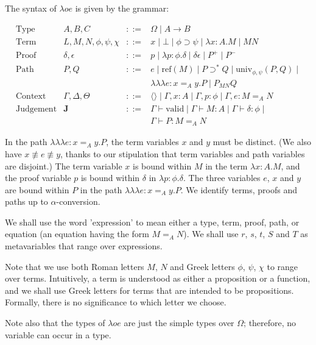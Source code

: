 \documentclass[a4paper,UKenglish]{lipics-v2016}
\newcommand*{\reff}[1]{\ensuremath{\mathrm{ref} \left( {#1} \right)}}
\newcommand*{\univ}[4]{\ensuremath{\mathrm{univ}_{{#1}, {#2}} \left({#3} , {#4} \right)}}
\newcommand*{\triplelambda}{\ensuremath{\lambda \!\! \lambda \!\! \lambda}}
\newcommand*{\vald}{\ensuremath{\vdash \mathrm{valid}}}
\theoremstyle{plain}
\begin{document}
The syntax of $\lambda o e$ is given by the grammar:

\[
\begin{array}{lrcl}
\text{Type} & A,B,C & ::= & \Omega \mid A \rightarrow B \\
\text{Term} & L,M,N, \phi,\psi,\chi & ::= & x \mid \bot \mid \phi \supset \psi \mid \lambda x:A.M \mid MN \\
\text{Proof} & \delta, \epsilon & ::= & p \mid \lambda p:\phi.\delta \mid \delta \epsilon \mid P^+ \mid P^- \\
\text{Path} & P, Q & ::= & e \mid \reff{M} \mid P \supset^* Q \mid \univ{\phi}{\psi}{P}{Q} \mid \\
& & & \triplelambda e : x =_A y. P \mid P_{MN} Q \\
\text{Context} & \Gamma, \Delta, \Theta & ::= & \langle \rangle \mid \Gamma, x : A \mid \Gamma, p : \phi \mid \Gamma, e : M =_A N \\
\text{Judgement} & \mathbf{J} & ::= & \Gamma \vald \mid \Gamma \vdash M : A \mid \Gamma \vdash \delta : \phi \mid \\
& & & \Gamma \vdash P : M =_A N
\end{array}
\]

In the path $\triplelambda e : x =_A y . P$, the term variables $x$ and $y$ must be distinct.  (We also have $x \not\equiv e \not\equiv y$, thanks to our
stipulation that term variables and path variables are disjoint.)  The term variable $x$ is bound within $M$ in the term $\lambda x:A.M$,
and the proof variable $p$ is bound within $\delta$ in $\lambda p:\phi.\delta$.  The three variables $e$, $x$ and $y$ are bound within $P$ in the path
$\triplelambda e:x =_A y.P$.  We identify terms, proofs and paths up to $\alpha$-conversion.

We shall use the word 'expression' to mean either a type, term, proof, path, or equation (an equation having the form $M =_A N$).  We shall use $r$, $s$, $t$, $S$ and $T$ as metavariables that range over expressions.

Note that we use both Roman letters $M$, $N$ and Greek letters $\phi$, $\psi$, $\chi$ to range over terms.  Intuitively, a term is understood as either a proposition or a function,
and we shall use Greek letters for terms that are intended to be propositions.  Formally, there is no significance to which letter we choose.

Note also that the types of $\lambda o e$ are just the simple types over $\Omega$; therefore, no variable can occur in a type.
\end{document}

